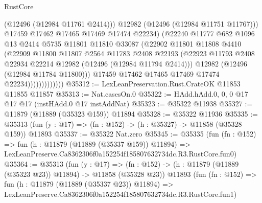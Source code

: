 \begin{lexlean}{RustCore}
\begin{coremodule}
                                (@12496 (@12984 @11761 @2414)))
                              @12982
                              (@12496 (@12984 @11751 @11767)))
                            @17459
                            @17462
                            @17465
                            @17469
                            @17474
                            @22234)
                          (@22240
                            @11777
                            @682
                            @1096
                            @13
                            @2414
                            @5735
                            @11801
                            @11810
                            @33087
                            (@22902
                              @11801
                              @11808
                              @4410
                              (@22909
                                @11800
                                @11807
                                @2564
                                @11783
                                @2408
                                @22193
                                (@22923
                                  @11793
                                  @2408
                                  @22934
                                  @22214
                                  @12982
                                  (@12496 (@12984 @11794 @2414)))
                                @12982
                                (@12496 (@12984 @11784 @11800)))
                              @17459
                              @17462
                              @17465
                              @17469
                              @17474
                              @22234)))))))))))))
@35312 := LexLeanPreservation.Rust.CrateOK @11853 @11855 @11857
@35313 := Nat.casesOn.{0}
@35322 := HAdd.hAdd.{0, 0, 0} @17 @17 @17 (instHAdd.{0} @17 instAddNat)
@35323 := @35322 @11938
@35327 := @11879 (@11889 (@35323 @159)) @11894
@35328 := @35322 @11936
@35335 := @35313 (fun (y : @17) => (fn : @152) -> (h : @35327) -> @11858 (@35328 @159)) @11893
@35337 := @35322 Nat.zero
@35345 := @35335
    (fun (fn : @152) =>
    fun (h : @11879 (@11889 (@35337 @159)) @11894) =>
    LexLeanPreserve.Ca8362306f0a152254f185807632734dc.R3.RustCore.fun0)
@35364 := @35313
    (fun (y : @17) =>
    (fn : @152) -> (h : @11879 (@11889 (@35323 @23)) @11894) -> @11858 (@35328 @23))
    @11893
    (fun (fn : @152) =>
    fun (h : @11879 (@11889 (@35337 @23)) @11894) =>
    LexLeanPreserve.Ca8362306f0a152254f185807632734dc.R3.RustCore.fun1)

\end{coremodule}
\end{lexlean}
